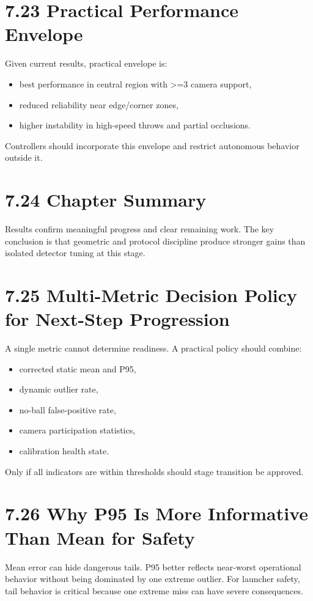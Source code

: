 \section{7.23 Practical Performance Envelope}
Given current results, practical envelope is:
\begin{itemize}
  \item best performance in central region with >=3 camera support,
  \item reduced reliability near edge/corner zones,
  \item higher instability in high-speed throws and partial occlusions.
\end{itemize}

Controllers should incorporate this envelope and restrict autonomous behavior outside it.

\section{7.24 Chapter Summary}
Results confirm meaningful progress and clear remaining work. The key conclusion is that geometric and protocol discipline produce stronger gains than isolated detector tuning at this stage.



\section{7.25 Multi-Metric Decision Policy for Next-Step Progression}
A single metric cannot determine readiness. A practical policy should combine:
\begin{itemize}
  \item corrected static mean and P95,
  \item dynamic outlier rate,
  \item no-ball false-positive rate,
  \item camera participation statistics,
  \item calibration health state.
\end{itemize}

Only if all indicators are within thresholds should stage transition be approved.

\section{7.26 Why P95 Is More Informative Than Mean for Safety}
Mean error can hide dangerous tails. P95 better reflects near-worst operational behavior without being dominated by one extreme outlier. For launcher safety, tail behavior is critical because one extreme miss can have severe consequences.

